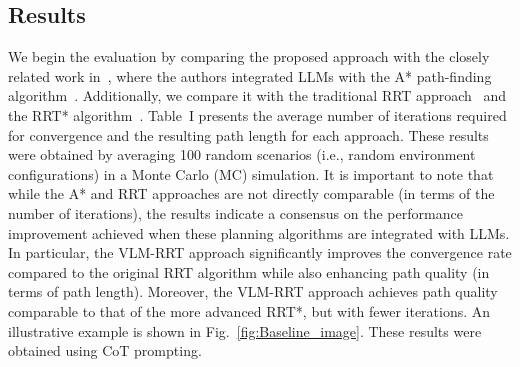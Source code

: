 \begin{table}[t]
\centering
\caption{Performance of VLM-RRT under various models and prompting techniques.}
\label{tab:VLM-RRT_Table}
\end{table}



\subsection{Results}

We begin the evaluation by comparing the proposed approach with the closely related work in~\cite{meng2024llm}, where the authors integrated LLMs with the A* path-finding algorithm~\cite{Hart1968}. Additionally, we compare it with the traditional RRT approach~\cite{lavalle1998rapidly} and the RRT* algorithm~\cite{karaman2011sampling}. Table~I presents the average number of iterations required for convergence and the resulting path length for each approach. These results were obtained by averaging 100 random scenarios (i.e., random environment configurations) in a Monte Carlo (MC) simulation.
It is important to note that while the A* and RRT approaches are not directly comparable (in terms of the number of iterations), the results indicate a consensus on the performance improvement achieved when these planning algorithms are integrated with LLMs. In particular, the VLM-RRT approach significantly improves the convergence rate compared to the original RRT algorithm while also enhancing path quality (in terms of path length). Moreover, the VLM-RRT approach achieves path quality comparable to that of the more advanced RRT*, but with fewer iterations. An illustrative example is shown in Fig.~\ref{fig:Baseline_image}. These results were obtained using CoT prompting.


